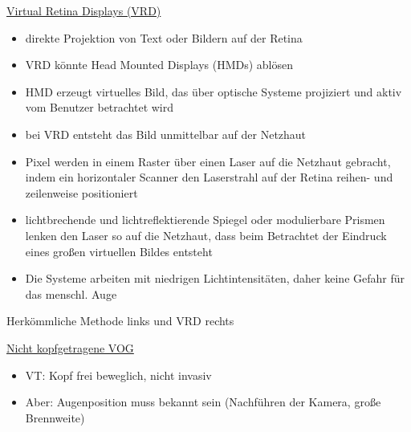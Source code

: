 \documentclass[a4paper,10pt,oneside]{article}
\begin{document}
\underline{Virtual Retina Displays (VRD)} \\
	\begin{itemize}
		\item direkte Projektion von Text oder Bildern auf der Retina
		\item VRD könnte Head Mounted Displays (HMDs) ablösen
		\item HMD erzeugt virtuelles Bild, das über optische Systeme projiziert und aktiv vom Benutzer betrachtet wird
		\item bei VRD entsteht das Bild unmittelbar auf der Netzhaut
		\item Pixel werden in einem Raster über einen Laser auf die Netzhaut gebracht, indem ein horizontaler Scanner den Laserstrahl auf der Retina reihen- und zeilenweise positioniert
		\item lichtbrechende und lichtreflektierende Spiegel oder modulierbare Prismen lenken den Laser so auf die Netzhaut, dass beim Betrachtet der Eindruck eines großen virtuellen Bildes entsteht
		\item Die Systeme arbeiten mit niedrigen Lichtintensitäten, daher keine Gefahr für das menschl. Auge
	\end{itemize}

Herkömmliche Methode links und VRD rechts

\underline{Nicht kopfgetragene VOG} \\
	\begin{itemize}
		\item VT: Kopf frei beweglich, nicht invasiv
		\item Aber: Augenposition muss bekannt sein (Nachführen der Kamera, große Brennweite)
	\end{itemize}	 
	
\end{document}
